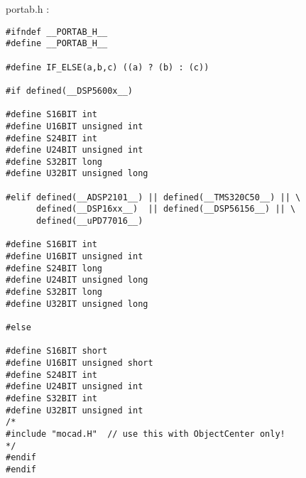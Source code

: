portab.h :
\begin{verbatim}
#ifndef __PORTAB_H__
#define __PORTAB_H__

#define IF_ELSE(a,b,c) ((a) ? (b) : (c))

#if defined(__DSP5600x__)

#define S16BIT int
#define U16BIT unsigned int
#define S24BIT int
#define U24BIT unsigned int
#define S32BIT long
#define U32BIT unsigned long

#elif defined(__ADSP2101__) || defined(__TMS320C50__) || \
      defined(__DSP16xx__)  || defined(__DSP56156__) || \
      defined(__uPD77016__)

#define S16BIT int
#define U16BIT unsigned int
#define S24BIT long
#define U24BIT unsigned long
#define S32BIT long
#define U32BIT unsigned long

#else

#define S16BIT short
#define U16BIT unsigned short
#define S24BIT int
#define U24BIT unsigned int
#define S32BIT int
#define U32BIT unsigned int
/*
#include "mocad.H"  // use this with ObjectCenter only!
*/
#endif
#endif
\end{verbatim}
